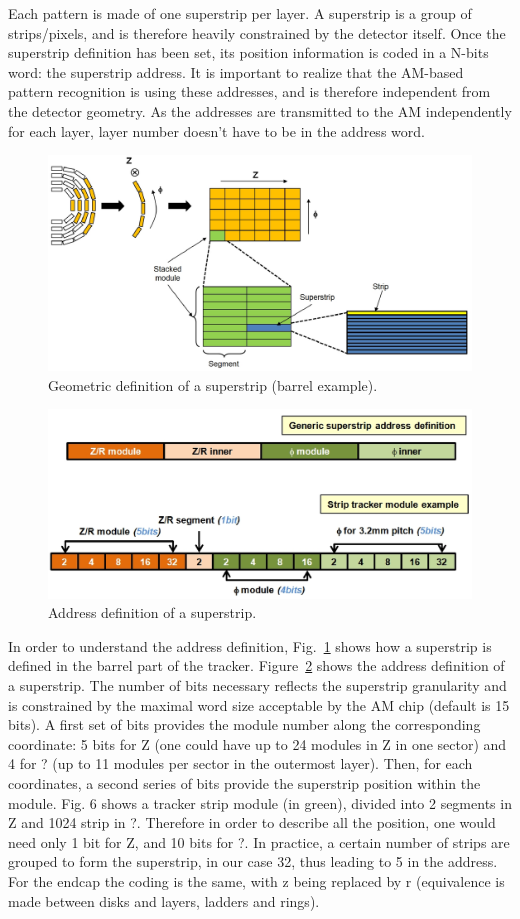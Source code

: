 \noindent Each pattern is made of one superstrip per layer. A superstrip is a group of strips/pixels, and is therefore heavily constrained by the detector itself. Once the superstrip definition has been set, its position information is coded in a N-bits word: the superstrip address. It is important to realize that the AM-based pattern recognition is using these addresses, and is therefore independent from the detector geometry. As the addresses are transmitted to the AM independently for each layer, layer number doesn't have to be in the address word. 

\begin{figure}[ht!]
\centering
\includegraphics[width=0.8\columnwidth]{Plots/SStripDef.eps}
\caption{Geometric definition of a superstrip (barrel example).}
\label{fig:Det_to_SS}
\end{figure}
\begin{figure}[ht!]
\centering
\includegraphics[width=0.6\columnwidth]{Plots/SSaddress.eps}
\caption{Address definition of a superstrip.}
\label{fig:SS_def}
\end{figure}

\noindent In order to understand the address definition, Fig.~\ref{fig:Det_to_SS} shows how a superstrip is defined in the barrel part of the tracker. Figure~\ref{fig:SS_def} shows the address definition of a superstrip. The number of bits necessary reflects the superstrip granularity and is constrained by the maximal word size acceptable by the AM chip (default is 15 bits). A first set of bits provides the module number along the corresponding coordinate: 5 bits for Z (one could have up to 24 modules in Z in one sector) and 4 for ? (up to 11 modules per sector in the outermost layer). Then, for each coordinates, a second series of bits provide the superstrip position within the module. Fig. 6 shows a tracker strip module (in green), divided into 2 segments in Z and 1024 strip in ?. Therefore in order to describe all the position, one would need only 1 bit for Z, and 10 bits for ?. In practice, a certain number of strips are grouped to form the superstrip, in our case 32, thus leading to 5 in the address. For the endcap the coding is the same, with z being replaced by r (equivalence is made between disks and layers, ladders and rings). 



\clearpage
